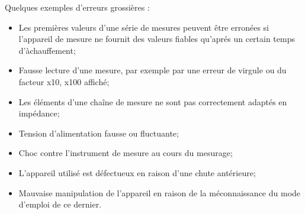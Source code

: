Quelques exemples d'erreurs grossières :
\begin{itemize}\itemsep2pt
\renewcommand{\labelitemi}{$\bullet$}
\item Les premières valeurs d'une série de mesures peuvent être erronées si l'appareil de mesure ne fournit des valeurs fiables qu'aprés un certain temps d'àchauffement;
\item Fausse lecture d'une mesure, par exemple par une erreur de virgule ou du facteur x10, x100 affiché;
\item Les éléments d'une chaîne de mesure ne sont pas correctement adaptés en impédance;
\item Tension d'alimentation fausse ou fluctuante;
\item Choc contre l'instrument de mesure au cours du mesurage;
\item L'appareil utilisé est défectueux en raison d'une chute antérieure;
\item Mauvaise manipulation de l'appareil en raison de la méconnaissance du mode d'emploi de ce dernier.
\end{itemize}

%

